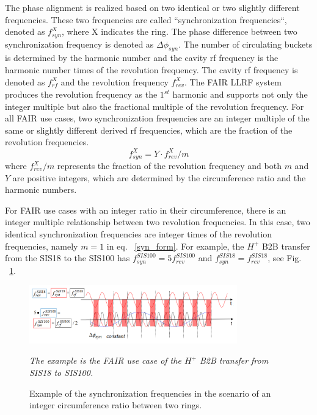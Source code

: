 The phase alignment is realized based on two identical or two slightly different frequencies. These two frequencies are called ``synchronization frequencies``, denoted as $f_\mathit{syn}^{X}$, where X indicates the ring. The phase difference between two synchronization frequency is denoted as $\Delta \phi_\mathit{syn}$. The number of circulating buckets is determined by the harmonic number and the cavity rf frequency is the harmonic number times of the revolution frequency. The cavity rf frequency is denoted as $f_\mathit{rf}^{X}$ and the revolution frequency $f_\mathit{rev}^{X}$. The FAIR LLRF system produces the revolution frequency as the $1^{st}$ harmonic and supports not only the integer multiple but also the fractional multiple of the revolution frequency. For all FAIR use cases, two synchronization frequencies are an integer multiple of the same or slightly different derived rf frequencies, which are the fraction of the revolution frequencies.
\begin{equation}
f_\mathit{syn}^{X}= Y\cdot f_\mathit{rev}^{X}/m
\label{syn_form}
\end{equation}
where $f_\mathit{rev}^{X}/m$ represents the fraction of the revolution frequency and both $m$ and $Y$ are positive integers, which are determined by the circumference ratio and the harmonic numbers. 

For FAIR use cases with an integer ratio in their circumference, there is an integer multiple relationship between two revolution frequencies. In this case, two identical synchronization frequencies are integer times of the revolution frequencies, namely $m=1$ in eq. ~\ref{syn_form}. For example, the $H^{+}$ B2B transfer from the SIS18 to the SIS100 has $f_{\mathit{syn}}^{SIS100}=5f_{\mathit{rev}}^{SIS100}$ and $f_{\mathit{syn}}^{SIS18}=f_{\mathit{rev}}^{SIS18}$, see Fig. ~\ref{USIS18}. 
\begin{figure}[!htb]
   \centering   
   \includegraphics*[width=90mm]{USIS18.png}
   \caption{Example of the synchronization frequencies in the scenario of an integer circumference ratio between two rings.}
{\textsl{\small{The example is the FAIR use case of the $H^{+}$ B2B transfer from SIS18 to SIS100.}}}
   \label{USIS18}
\end{figure} 

